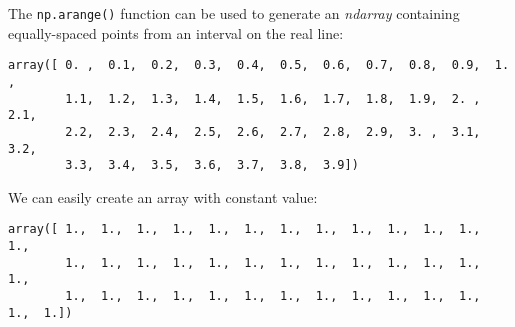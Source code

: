 \documentclass[english,serif,mathserif,xcolor=pdftex,dvipsnames,table]{beamer}
\begin{document}
\begin{Shaded}
\end{Shaded}

The \texttt{np.arange()} function can be used to generate an
\emph{ndarray} containing equally-spaced points from an interval on the
real line:

\begin{Shaded}
\begin{Highlighting}[]
\CommentTok{# points in the interval [0,4) spaces 0.1 apart }
\OperatorTok{=} \NormalTok{, }\NormalTok{, }\NormalTok{)}
\end{Highlighting}
\end{Shaded}

\begin{Shaded}
\begin{Highlighting}[]
\end{Highlighting}
\end{Shaded}

\begin{verbatim}
array([ 0. ,  0.1,  0.2,  0.3,  0.4,  0.5,  0.6,  0.7,  0.8,  0.9,  1. ,
        1.1,  1.2,  1.3,  1.4,  1.5,  1.6,  1.7,  1.8,  1.9,  2. ,  2.1,
        2.2,  2.3,  2.4,  2.5,  2.6,  2.7,  2.8,  2.9,  3. ,  3.1,  3.2,
        3.3,  3.4,  3.5,  3.6,  3.7,  3.8,  3.9])
\end{verbatim}

We can easily create an array with constant value:

\begin{Shaded}
\begin{Highlighting}[]
\OperatorTok{=} 
\end{Highlighting}
\end{Shaded}

\begin{Shaded}
\begin{Highlighting}[]
\end{Highlighting}
\end{Shaded}

\begin{verbatim}
array([ 1.,  1.,  1.,  1.,  1.,  1.,  1.,  1.,  1.,  1.,  1.,  1.,  1.,
        1.,  1.,  1.,  1.,  1.,  1.,  1.,  1.,  1.,  1.,  1.,  1.,  1.,
        1.,  1.,  1.,  1.,  1.,  1.,  1.,  1.,  1.,  1.,  1.,  1.,  1.,  1.])
\end{verbatim}
\end{document}
